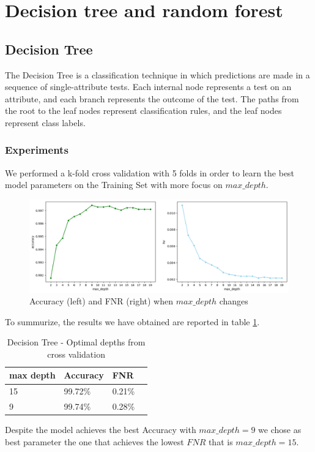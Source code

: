\documentclass[twocolumn, switch]{article} %
\newcommand\x{0.7}
\begin{document}
\section{Decision tree and random forest}
\label{sec:tree}
\subsection{Decision Tree}
The Decision Tree is a classification technique in which predictions are made in a sequence of single-attribute tests.
Each internal node represents a test on an attribute, and each branch represents the outcome of the test. The paths from the root to the leaf nodes represent classification rules, and the leaf nodes represent class labels.
\subsubsection{Experiments}
\label{sub:tree}
We performed a k-fold cross validation with 5 folds in order to learn the best model parameters on the Training Set with more focus on $max\_depth$.
\begin{figure}[ht!]
	\centering
	\includegraphics[width=\x\linewidth]{tree_accuracy_fnr.png}
	\caption{Accuracy (left) and FNR (right) when $max\_depth$ changes}
	\label{fig:treetrain}
\end{figure}
To summurize, the results we have obtained are reported in table \ref{tab:treetrain}.
\begin{table}[ht!]
	\centering
	{\small
		\begin{tabular}{|l|l|l|l|}
			\hline
			\textbf{max depth} & \textbf{Accuracy} & \textbf{FNR} \\ \hline
			15                 & 99.72\%           & 0.21\%       \\ \hline
			9                  & 99.74\%           & 0.28\%       \\ \hline
		\end{tabular}
		\caption{Decision Tree - Optimal depths from cross validation}
		\label{tab:treetrain}
		\vspace{-5mm}
	}
\end{table}
Despite the model achieves the best Accuracy with $max\_depth = 9$ we chose as best parameter the one that achieves the lowest $FNR$ that is $max\_depth = 15$.
\end{document}
